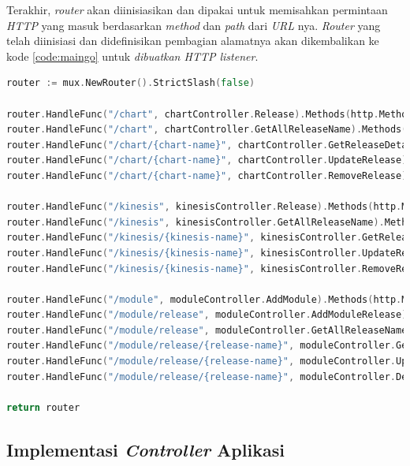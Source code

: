 Terakhir, \textit{router} akan diinisiasikan dan dipakai untuk memisahkan permintaan \textit{HTTP} yang masuk berdasarkan \textit{method} dan \textit{path} dari \textit{URL} nya. \textit{Router} yang telah diinisiasi dan didefinisikan pembagian alamatnya akan dikembalikan ke kode \ref{code:maingo} untuk \textit{dibuatkan HTTP listener}.

\begin{lstlisting}[frame=single,language=Go,caption={Inisiasi dan penggunaan \textit{Router}},label={code:routerInit}]
router := mux.NewRouter().StrictSlash(false)

router.HandleFunc("/chart", chartController.Release).Methods(http.MethodPost)
router.HandleFunc("/chart", chartController.GetAllReleaseName).Methods(http.MethodGet)
router.HandleFunc("/chart/{chart-name}", chartController.GetReleaseDetail).Methods(http.MethodGet)
router.HandleFunc("/chart/{chart-name}", chartController.UpdateRelease).Methods(http.MethodPut)
router.HandleFunc("/chart/{chart-name}", chartController.RemoveRelease).Methods(http.MethodDelete)

router.HandleFunc("/kinesis", kinesisController.Release).Methods(http.MethodPost)
router.HandleFunc("/kinesis", kinesisController.GetAllReleaseName).Methods(http.MethodGet)
router.HandleFunc("/kinesis/{kinesis-name}", kinesisController.GetReleaseDetail).Methods(http.MethodGet)
router.HandleFunc("/kinesis/{kinesis-name}", kinesisController.UpdateRelease).Methods(http.MethodPut)
router.HandleFunc("/kinesis/{kinesis-name}", kinesisController.RemoveRelease).Methods(http.MethodDelete)

router.HandleFunc("/module", moduleController.AddModule).Methods(http.MethodPost)
router.HandleFunc("/module/release", moduleController.AddModuleRelease).Methods(http.MethodPost)
router.HandleFunc("/module/release", moduleController.GetAllReleaseName).Methods(http.MethodGet)
router.HandleFunc("/module/release/{release-name}", moduleController.GetReleaseDetail).Methods(http.MethodGet)
router.HandleFunc("/module/release/{release-name}", moduleController.UpdateModuleRelease).Methods(http.MethodPut)
router.HandleFunc("/module/release/{release-name}", moduleController.DeleteModuleRelease).Methods(http.MethodDelete)

return router
\end{lstlisting}

\subsection{Implementasi \textit{Controller} Aplikasi}
\label{sec:controller}

